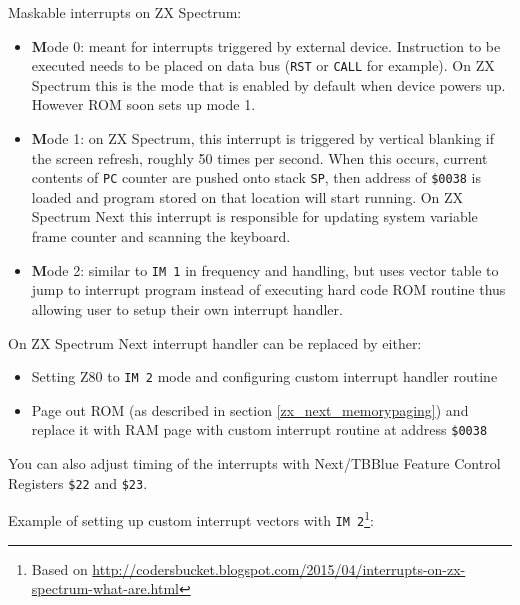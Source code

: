 \documentclass[12pt,twoside,openright,a4paper]{book}
\begin{document}
Maskable interrupts on ZX Spectrum:

\begin{itemize}
	\item {\textbf Mode 0}: meant for interrupts triggered by external device. Instruction to be executed needs to be placed on data bus ({\tt RST} or {\tt CALL} for example). On ZX Spectrum this is the mode that is enabled by default when device powers up. However ROM soon sets up mode 1.
	
	\item {\textbf Mode 1}: on ZX Spectrum, this interrupt is triggered by vertical blanking if the screen refresh, roughly 50 times per second. When this occurs, current contents of {\tt PC} counter are pushed onto stack {\tt SP}, then address of {\tt \$0038} is loaded and program stored on that location will start running. On ZX Spectrum Next this interrupt is responsible for updating system variable frame counter and scanning the keyboard.
	
	\item {\textbf Mode 2}: similar to {\tt IM 1} in frequency and handling, but uses vector table to jump to interrupt program instead of executing hard code ROM routine thus allowing user to setup their own interrupt handler.
\end{itemize}

On ZX Spectrum Next interrupt handler can be replaced by either:

\begin{itemize}
	\item Setting Z80 to {\tt IM 2} mode and configuring custom interrupt handler routine
	
	\item Page out ROM (as described in section \ref{zx_next_memorypaging}) and replace it with RAM page with custom interrupt routine at address {\tt \$0038}
\end{itemize}

You can also adjust timing of the interrupts with Next/TBBlue Feature Control Registers {\tt \$22} and {\tt \$23}.

\pagebreak
Example of setting up custom interrupt vectors with {\tt IM 2}\footnote{Based on \url{http://codersbucket.blogspot.com/2015/04/interrupts-on-zx-spectrum-what-are.html}}:
\end{document}
